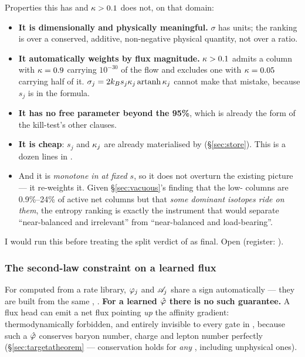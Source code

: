 Properties this has and $\kappa > 0.1$ does not, on that domain:

\begin{itemize}
\item \textbf{It is dimensionally and physically meaningful.} $\sigma$ has
  units; the ranking is over a conserved, additive, non-negative physical
  quantity, not over a ratio.
\item \textbf{It automatically weights by flux magnitude.} $\kappa > 0.1$ admits a
  column with $\kappa = 0.9$ carrying $10^{-30}$ of the flow and excludes one with
  $\kappa = 0.05$ carrying half of it.
  $\sigma_j = 2k_{B} s_j\kappa_j\operatorname{artanh}\kappa_j$ cannot make that mistake, because
  $s_j$ is in the formula.
\item \textbf{It has no free parameter beyond the 95\%}, which is already the
  form of the kill-test's other clauses.
\item \textbf{It is cheap}: $s_j$ and $\kappa_j$ are already materialised by
   (\S\ref{sec:store}). This is a dozen lines in
  .
\item And it is \emph{monotone in \kap{} at fixed $s$}, so it does not overturn
  the existing picture --- it re-weights it. Given \S\ref{sec:vacuous}'s finding
  that the low-\kap{} columns are 0.9\%--24\% of active net columns but that
  \emph{some dominant isotopes ride on them}, the entropy ranking is exactly the
  instrument that would separate ``near-balanced and irrelevant'' from
  ``near-balanced and load-bearing''.
\end{itemize}

I would run this before treating the split verdict of  as
final. Open (register: ).

\subsubsection{The second-law constraint on a learned flux}
\label{sec:secondlaw}

For \netflux{} computed from a rate library, $\varphi_j$ and $\mathscr{A}_j$ share a
sign automatically --- they are built from the same \fp, \fm. \textbf{For a
learned $\hat{\varphi}$ there is no such guarantee.} A flux head can emit a net
flux pointing \emph{up} the affinity gradient: thermodynamically forbidden, and
entirely invisible to every gate in , because such a
$\hat{\varphi}$ conserves baryon number, charge and lepton number perfectly
(\S\ref{sec:targetatheorem} --- conservation holds for \emph{any} \netflux,
including unphysical ones).

